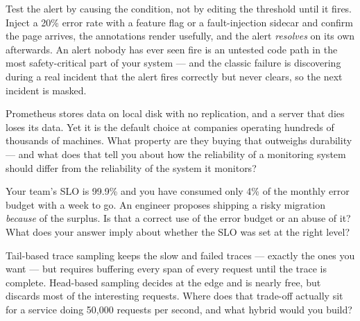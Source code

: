\begin{prodtip}
Test the alert by causing the condition, not by editing the threshold until it fires. Inject a 20\% error rate with a feature flag or a fault-injection sidecar and confirm the page arrives, the annotations render usefully, and the alert \emph{resolves} on its own afterwards. An alert nobody has ever seen fire is an untested code path in the most safety-critical part of your system --- and the classic failure is discovering during a real incident that the alert fires correctly but never clears, so the next incident is masked.
\end{prodtip}


\begin{thinkbox}
Prometheus stores data on local disk with no replication, and a server that dies loses its data. Yet it is the default choice at companies operating hundreds of thousands of machines. What property are they buying that outweighs durability --- and what does that tell you about how the reliability of a monitoring system should differ from the reliability of the system it monitors?
\end{thinkbox}

\begin{thinkbox}
Your team's SLO is 99.9\% and you have consumed only 4\% of the monthly error budget with a week to go. An engineer proposes shipping a risky migration \emph{because} of the surplus. Is that a correct use of the error budget or an abuse of it? What does your answer imply about whether the SLO was set at the right level?
\end{thinkbox}

\begin{thinkbox}
Tail-based trace sampling keeps the slow and failed traces --- exactly the ones you want --- but requires buffering every span of every request until the trace is complete. Head-based sampling decides at the edge and is nearly free, but discards most of the interesting requests. Where does that trade-off actually sit for a service doing 50{,}000 requests per second, and what hybrid would you build?
\end{thinkbox}



